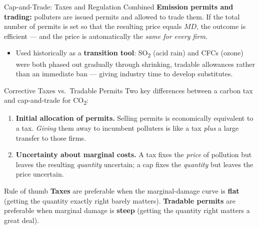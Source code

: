 \documentclass[11pt,aspectratio=169]{beamer}
\begin{document}
\begin{frame}{Cap-and-Trade: Taxes and Regulation Combined}
	\textbf{Emission permits and trading:} polluters are issued permits and allowed to trade them. If the total number of permits is set so that the resulting price equals \(MD\), the outcome is efficient --- and the price is automatically the \emph{same for every firm}.
	\begin{itemize}
		\item Used historically as a \textbf{transition tool}: SO\textsubscript{2} (acid rain) and CFCs (ozone) were both phased out gradually through shrinking, tradable allowances rather than an immediate ban --- giving industry time to develop substitutes.
	\end{itemize}
\end{frame}

\begin{frame}{Corrective Taxes vs.\ Tradable Permits}
	Two key differences between a carbon tax and cap-and-trade for CO\textsubscript{2}:
	\begin{enumerate}
		\item \textbf{Initial allocation of permits.} Selling permits is economically equivalent to a tax. \emph{Giving} them away to incumbent polluters is like a tax \emph{plus} a large transfer to those firms.
		\item \textbf{Uncertainty about marginal costs.} A tax fixes the \emph{price} of pollution but leaves the resulting \emph{quantity} uncertain; a cap fixes the \emph{quantity} but leaves the price uncertain.
	\end{enumerate}
	\vspace{0.5em}
	\begin{block}{Rule of thumb}
		\textbf{Taxes} are preferable when the marginal-damage curve is \textbf{flat} (getting the quantity exactly right barely matters). \textbf{Tradable permits} are preferable when marginal damage is \textbf{steep} (getting the quantity right matters a great deal).
	\end{block}
\end{frame}
\end{document}

